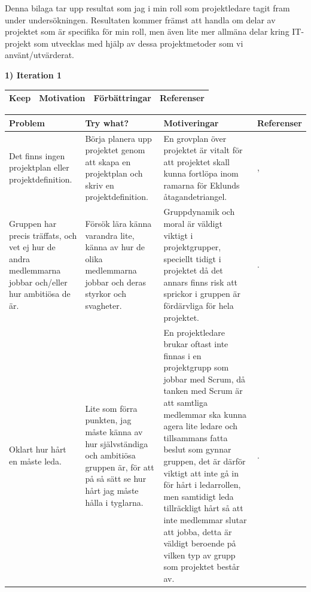 \documentclass[conference,a4paper]{IEEEtran}
\newcommand\Tstrut{\rule{0pt}{2.6ex}}       %
\newcommand\Bstrut{\rule[-0.9ex]{0pt}{0pt}} %
\newcommand{\TBstrut}{\Tstrut\Bstrut} %
\begin{document}
Denna bilaga tar upp resultat som jag i min roll som projektledare tagit fram under undersökningen. Resultaten kommer främst att handla om delar av projektet som är specifika för min roll, men även lite mer allmäna delar kring IT-projekt som utvecklas med hjälp av dessa projektmetoder som vi använt/utvärderat.

\textbf{1) Iteration 1}

\begin{table}[H]
	\small
  \centering
	\begin{tabular}{|p{1.5cm}|p{2cm}|p{1.8cm}|p{1.5cm}|} %
    \hline
    Keep & Motivation & Förbättringar & Referenser \TBstrut \\
    \hline
  \end{tabular}
\end{table}

\begin{table}[H]
	\small
  \centering
	\begin{tabular}{|p{1.5cm}|p{2cm}|p{1.8cm}|p{1.5cm}|} %
    \hline
    Problem & Try what? & Motiveringar & Referenser \TBstrut \\
    \hline
    Det finns ingen projektplan eller projektdefinition. & Börja planera upp projektet genom att skapa en projektplan och skriv en projektdefinition. & En grovplan över projektet är vitalt för att projektet skall kunna fortlöpa inom ramarna för Eklunds åtagandetriangel. & \cite[s. 128]{Eklund14}, \cite[s. 72]{Sommerville10} \TBstrut \\
    \hline
    Gruppen har precis träffats, och vet ej hur de andra medlemmarna jobbar och/eller hur ambitiösa de är. & Försök lära känna varandra lite, känna av hur de olika medlemmarna jobbar och deras styrkor och svagheter. & Gruppdynamik och moral är väldigt viktigt i projektgrupper, speciellt tidigt i projektet då det annars finns risk att sprickor i gruppen är fördärvliga för hela projektet. & \cite[kap. 7]{Eklund14}. \TBstrut \\
    \hline
    Oklart hur hårt en måste leda. & Lite som förra punkten, jag måste känna av hur självständiga och ambitiösa gruppen är, för att på så sätt se hur hårt jag måste hålla i tyglarna. & En projektledare brukar oftast inte finnas i en projektgrupp som jobbar med Scrum, då tanken med Scrum är att samtliga medlemmar ska kunna agera lite ledare och tillsammans fatta beslut som gynnar gruppen, det är därför viktigt att inte gå in för hårt i ledarrollen, men samtidigt leda tillräckligt hårt så att inte medlemmar slutar att jobba, detta är väldigt beroende på vilken typ av grupp som projektet består av. & \cite[s. 73-74]{Sommerville10}. \TBstrut \\
    \hline
  \end{tabular}
\end{table}
\end{document}

